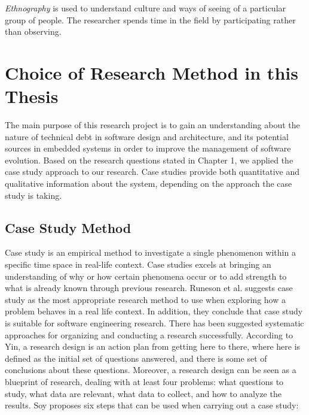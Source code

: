 \textit{{Ethnography}} is used to understand culture and ways of seeing of a particular group of people. The researcher spends time in the field by participating rather than observing.





\section{Choice of Research Method in this Thesis}
\label{sec:choiceofmethod}
The main purpose of this research project is to gain an understanding about the nature of technical debt in software design and architecture, and its potential sources in embedded systems in order to improve the management of software evolution. Based on the research questions stated in Chapter 1, we applied the case study approach to our research. Case studies provide both quantitative and qualitative information about the system\cite{Oates:2006:RIS:1202299}, depending on the approach the case study is taking.


\subsection{Case Study Method}
\label{subsec:casestudymethod}
Case study is an empirical method to investigate a single phenomenon within a specific time space in real-life context\cite{Wohlin:2000:ESE:330775}. Case studies excels at bringing an understanding of why or how certain phenomena occur or to add strength to what is already known through previous research\cite{Wohlin:2000:ESE:330775,soysusan}. Runeson et al.\cite{Runeson:2009:GCR:1519313.1519324} suggests case study as the most appropriate research method to use when exploring how a problem behaves in a real life context. In addition, they conclude that case study is suitable for software engineering research. There has been suggested systematic approaches for organizing and conducting a research successfully\cite{soysusan,Runeson:2009:GCR:1519313.1519324}. According to Yin\cite{yin2003case}, a research design is an action plan from getting here to there, where here is defined as the initial set of questions answered, and there is some set of conclusions about these questions. Moreover, a research design can be seen as a blueprint of research, dealing with at least four problems: what questions to study, what data are relevant, what data to collect, and how to analyze the results\cite{yin2003case}. Soy\cite{soysusan} proposes six steps that can be used when carrying out a case study:

